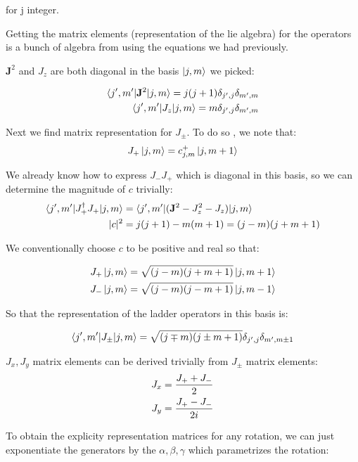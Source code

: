 \documentclass[12pt]{scrartcl}
\begin{document}
for j integer.

Getting the matrix elements (representation of the lie algebra) for the operators is a bunch of algebra from using the equations we had previously.

$\mathbf{J}^2$ and $J_z$ are both diagonal in the basis $\ket{j, m}$ we picked:

\begin{align}
\braket{j', m' | \mathbf{J}^2 |j, m} = j(j+1) \delta_{j', j} \delta_{m', m} \\
\braket{j', m' | J_{z} |j, m} = m \delta_{j', j} \delta_{m', m}
\end{align}

Next we find matrix representation for $J_\pm$.  To do so , we note that:
\begin{align}
J_+ \ket{j, m} = c^+_{j, m} \ket{j, m+1}
\end{align}

We already know how to express $J_- J_+$  which is diagonal in this basis, so we can determine the magnitude of $c$ trivially: 
\begin{align}
\braket{j', m' | J_+^\dagger J_+ |j, m} &= \braket{j', m' |(\mathbf{J}^2 - J_z^2 - J_z)  |j, m}  \\
|c|^2 &= j(j+1) - m(m+1) = (j-m) (j+ m + 1)
\end{align}

We conventionally choose $c$ to be positive and real so that:

\begin{align}
J_{+} \ket{j, m} &= \sqrt{(j-m) (j+ m + 1)} \ket{j, m+1} \\
J_{-} \ket{j, m} &= \sqrt{(j-m) (j - m + 1)} \ket{j, m-1} 
\end{align}

So that the representation of the ladder operators in this basis is:

\begin{align}
\braket{j', m' | J_{\pm}  |j, m} =  \sqrt{(j \mp m) (j \pm m + 1)} \delta_{j', j} \delta_{m', m \pm 1}
\end{align}

$J_x, J_y$ matrix elements can be derived trivially from $J_{\pm}$ matrix elements:
\begin{align}
J_x &= {J_+ + J_- \over 2} \\
J_y &= {J_+ - J_- \over 2 i}
\end{align}

To obtain the explicity representation matrices for any rotation, we can just exponentiate the generators by the  $\alpha, \beta, \gamma$ which parametrizes the rotation:
\end{document}
